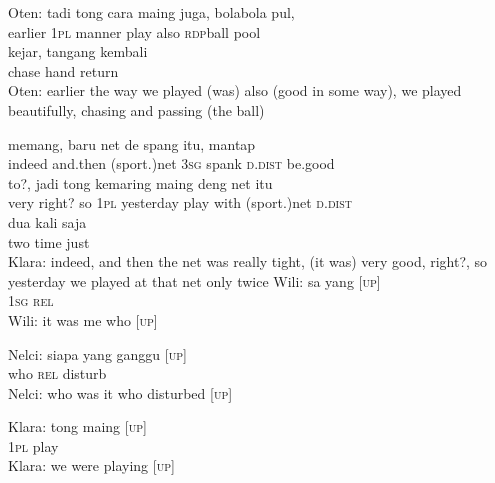 \ea
\gll   Oten:   tadi    {tong}   cara   maing   juga,   bola{\Tilde}bola   pul,\\
{}     earlier    {\textsc{1pl}}   manner   play   also   \textsc{rdp}{\Tilde}ball   pool\\
\gll  kejar,    {tangang}    {kembali}\\
  chase    {hand}    {return}\\
\glt
Oten: earlier the way we played (was) also (good in some way), we played beautifully, chasing and passing (the ball)
\z

\ea
{}    {memang,}    {baru}    {net}   de    {spang}   itu,    {mantap}\\
   {}    {indeed}    {and.then}    {(sport.)net}   \textsc{3sg}    {spank}   \textsc{d.dist}    {be.good}\\
    {to?,}    {jadi}   tong    {kemaring}    {maing}   deng    {net}   itu\\
   {very}    {right?}    {so}   \textsc{1pl}    {yesterday}    {play}   with    {(sport.)net}   \textsc{d.dist}\\
\gll  dua    {kali}    {saja}\\
  two    {time}    {just}\\
\glt
Klara: indeed, and then the net was really tight, (it was) very good, right?, so yesterday we played at that net only twice
\z
\ea
\gll   Wili:   sa   yang   \textup{[\textsc{up}]}\\
 {}    \textsc{1sg}   \textsc{rel}   \\
\glt
Wili: it was me who [\textsc{up}]
\z

\ea
\gll   Nelci:   siapa   yang   ganggu   \textup{[\textsc{up}]}\\
{}     who   \textsc{rel}   disturb   \\
\glt
Nelci: who was it who disturbed [\textsc{up}]
\z

\ea
\gll   Klara:   tong   maing   \textup{[\textsc{up}]}\\
  {}   \textsc{1pl}   play   \\
\glt
Klara: we were playing [\textsc{up}]
\z

